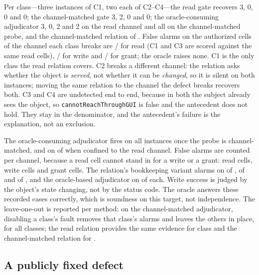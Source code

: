 Per class---three instances of C1, two each of C2--C4---the read gate recovers 3, 0, 0 and 0;
the channel-matched gate 3, 2, 0 and 0; the oracle-consuming adjudicator 3, 0, 2 and 2 on the
read channel and all \McInstances{} on the channel-matched probe, and the channel-matched
relation \McChannelHits{} of \McInstances{}. False alarms on the authorized cells of the channel
each class breaks are \McFpRelRead/\McNegRead{} for read (C1 and C3 are scored against the same
read cells), \McFpRelWrite/\McNegWrite{} for write and \McFpRelGrant/\McNegGrant{} for grant;
the oracle raises none. C1 is the only
class the read relation
covers. C2 breaks a different channel: the relation asks whether the object is \emph{served},
not whether it can be \emph{changed}, so it is silent on both instances; moving the same
relation to the channel the defect breaks recovers both. C3 and C4 are undetected end to end,
because in both the subject already sees the object, so \texttt{cannotReachThroughGUI} is
false and the antecedent does not hold. They stay in the denominator, and the antecedent's
failure is the explanation, not an exclusion.

The oracle-consuming adjudicator fires on all \McInstances{} instances once the probe is
channel-matched, and on \McOracleReadHits{} of \McInstances{} when confined to the read
channel. False alarms are counted per channel, because a read cell cannot stand in for a write
or a grant: \McNegRead{} read cells, \McNegWrite{} write cells and \McNegGrant{} grant cells.
The relation's bookkeeping variant alarms on \McFpRelRead{} of \McNegRead{}, \McFpRelWrite{}
of \McNegWrite{} and \McFpRelGrant{} of \McNegGrant{}, and the oracle-based adjudicator on
\McFpOracleMax{} of each. Write success is judged by the object's state changing, not by the
status code. The oracle answers these recorded cases correctly, which is soundness on this
target, not independence. The leave-one-out is reported per method: on the channel-matched
adjudicator, disabling a class's fault removes that class's alarms and leaves the others in
place, for all \McLooAdjudicatorClasses{} classes; the read relation provides the same
evidence for \McLooReadClasses{} class and the channel-matched relation for
\McLooChannelClasses{}.

\subsection{A publicly fixed defect}
\label{sec:cvepair}

